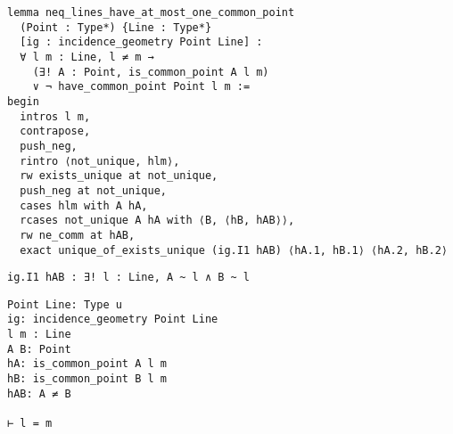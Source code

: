 










\begin{frame}[fragile]
	\begin{multicols}{2}
		\begin{lstlisting}
lemma neq_lines_have_at_most_one_common_point 
  (Point : Type*) {Line : Type*} 
  [ig : incidence_geometry Point Line] :
  ∀ l m : Line, l ≠ m → 
    (∃! A : Point, is_common_point A l m) 
    ∨ ¬ have_common_point Point l m := 
begin
  intros l m,
  contrapose,
  push_neg,
  rintro ⟨not_unique, hlm⟩,
  rw exists_unique at not_unique,
  push_neg at not_unique,
  cases hlm with A hA,
  rcases not_unique A hA with ⟨B, ⟨hB, hAB⟩⟩,
  rw ne_comm at hAB,
  exact unique_of_exists_unique (ig.I1 hAB) ⟨hA.1, hB.1⟩ ⟨hA.2, hB.2⟩
\end{lstlisting}
		\vspace{1em}
		\begin{lstlisting}
ig.I1 hAB : ∃! l : Line, A ~ l ∧ B ~ l
\end{lstlisting}
		\columnbreak
		\begin{lstlisting}
Point Line: Type u
ig: incidence_geometry Point Line
l m : Line
A B: Point
hA: is_common_point A l m
hB: is_common_point B l m
hAB: A ≠ B

⊢ l = m
\end{lstlisting}
	\end{multicols}
\end{frame}










